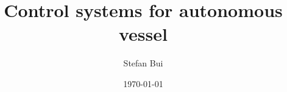 \newcommand{\mytitle}{Control systems for autonomous vessel}
\newcommand{\myauthor}{Stefan Bui}

\title{\mytitle}
\author{\myauthor}
\date{\today}
